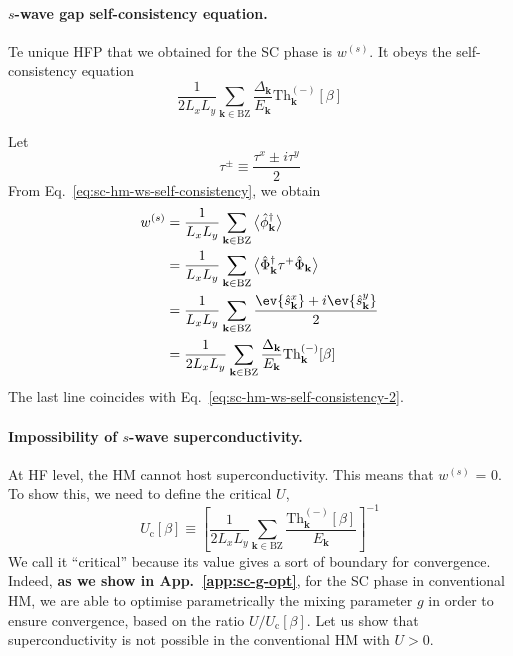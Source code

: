 \paragraph{$s$-wave gap self-consistency equation.}

Te unique HFP that we obtained for the SC phase is $w^{(s)}$. It obeys the self-consistency equation
\begin{equation}\label{eq:sc-hm-ws-self-consistency-2}
	\frac{1}{2 L_x L_y} \sum_{\mathbf{k}\in\mathrm{BZ}} \frac{\Delta_\mathbf{k}}{E_\mathbf{k}} \mathrm{Th}_\mathbf{k}^{(-)}[\beta]
\end{equation}

\begin{tabproof}

	Let
	\[
		\tau^\pm \equiv \frac{\tau^x \pm i \tau^y}{2}
	\]
	From Eq.~\eqref{eq:sc-hm-ws-self-consistency}, we obtain
	\[
	\begin{aligned}
		w^{(s)} &= \frac{1}{L_x L_y} \sum_{\mathbf{k}\in\mathrm{BZ}} \big\langle
		\hat \phi_\mathbf{k}^\dagger
		\big\rangle \\
		&= \frac{1}{L_x L_y} \sum_{\mathbf{k}\in\mathrm{BZ}} \big\langle
		\hat \Phi_\mathbf{k}^\dagger \tau^+ \hat \Phi_\mathbf{k}
		\big\rangle \\
		&= \frac{1}{L_x L_y} \sum_{\mathbf{k}\in\mathrm{BZ}} \frac{	
			\ev{\hat s_\mathbf{k}^x} + i \ev{\hat s_\mathbf{k}^y}
		}{2} \nonumber \\
		&= \frac{1}{2 L_x L_y} \sum_{\mathbf{k}\in\mathrm{BZ}} \frac{\Delta_\mathbf{k}}{E_\mathbf{k}} \mathrm{Th}_\mathbf{k}^{(-)}[\beta]
	\end{aligned}
	\]
	The last line coincides with Eq.~\eqref{eq:sc-hm-ws-self-consistency-2}.
	
\end{tabproof}

\paragraph{Impossibility of $s$-wave superconductivity.}

At HF level, the HM cannot host superconductivity. This means that $w^{(s)}$ = 0. To show this, we need to define the critical $U$,
\begin{equation}\label{eq:sc-hm-Uc}
	U_\mathrm{c}[\beta] \equiv \left[
	\frac{1}{2 L_x L_y} \sum_{\mathbf{k}\in\mathrm{BZ}} \frac{\mathrm{Th}_\mathbf{k}^{(-)}[\beta]}{E_\mathbf{k}}
	\right]^{-1}
\end{equation}
We call it ``critical'' because its value gives a sort of boundary for convergence. Indeed, {\color{tabred}\textbf{as we show in App.~\ref{app:sc-g-opt}}}, for the SC phase in conventional HM, we are able to optimise parametrically the mixing parameter $g$ in order to ensure convergence, based on the ratio $U/U_\mathrm{c}[\beta]$. Let us show that superconductivity is not possible in the conventional HM with $U>0$.


